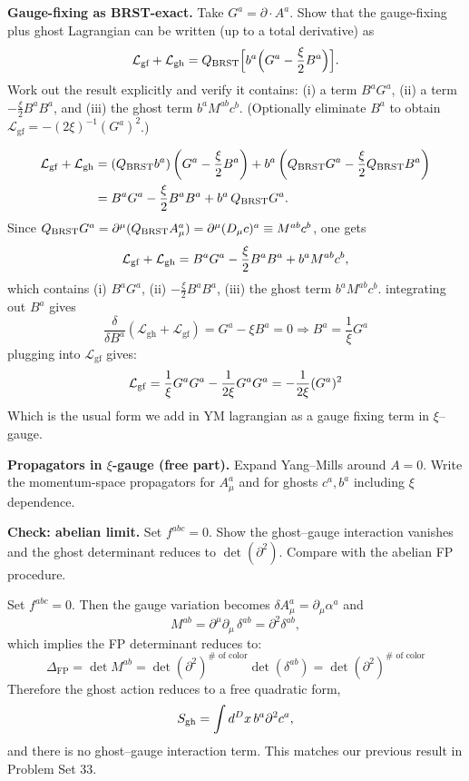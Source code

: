 \begin{problem}
    \textbf{Gauge-fixing as BRST-exact.} Take \(G^a=\partial\cdot A^a\). Show that the gauge-fixing plus ghost Lagrangian can be written (up to a total derivative) as
    \[
        \mathcal{L}_{\text{gf}}+\mathcal{L}_{\text{gh}}=Q_{\text{BRST}}\Bigl[b^a\Bigl(G^a-\frac{\xi}{2}B^a\Bigr)\Bigr].
    \]
    Work out the result explicitly and verify it contains: (i) a term \(B^aG^a\), (ii) a term \(-\frac{\xi}{2}B^aB^a\), and (iii) the ghost term \(b^aM^{ab}c^b\). (Optionally eliminate \(B^a\) to obtain \(\mathcal{L}_{\text{gf}}=-(2\xi)^{-1}(G^a)^2\).)
\end{problem}
\begin{solution}[35.5]
	\[
		\begin{aligned}
		\mathcal L_{\rm gf}+\mathcal L_{\rm gh}
		&= (Q_{\rm BRST}b^a)\left(G^a-\frac{\xi}{2}B^a\right)
		+ b^a\left(Q_{\rm BRST}G^a-\frac{\xi}{2}Q_{\rm BRST}B^a\right) \\
		&= B^a G^a - \frac{\xi}{2}B^a B^a + b^a\,Q_{\rm BRST}G^a .
	\end{aligned}
	\]
	Since $Q_{\rm BRST}G^a=\partial^\mu(Q_{\rm BRST}A_\mu^a)=\partial^\mu(D_\mu c)^a \equiv M^{ab}c^b$, one gets
	\[
		\mathcal L_{\rm gf}+\mathcal L_{\rm gh}
		= B^a G^a - \frac{\xi}{2}B^a B^a + b^a M^{ab}c^b,
	\]
	which contains (i) $B^aG^a$, (ii) $-\frac{\xi}{2}B^aB^a$, (iii) the ghost term $b^aM^{ab}c^b$. integrating out $B^a$ gives 
	\[
	\frac{\delta}{\delta B^a}\left(\mathcal{L}_{\text{gh}}+\mathcal{L}_{\text{gf}}\right)=G^a-\xi  B^a=0\Rightarrow B^a=\frac1\xi G^a
	\]
	plugging into $\mathcal{L}_{\text{gf}}$ gives:
	\[
 		\mathcal L_{\rm gf} =\frac1\xi G^a G^a-\frac{1}{2\xi} G^a G^a= -\frac{1}{2\xi}(G^a)^2
	\]
	Which is the usual form we add in YM lagrangian as a gauge fixing term in $\xi$--gauge.
\end{solution}
\begin{problem}
    \textbf{Propagators in \(\xi\)-gauge (free part).} Expand Yang–Mills around \(A=0\). Write the momentum-space propagators for \(A_\mu^a\) and for ghosts \(c^a,b^a\) including \(\xi\) dependence.
\end{problem}
\begin{problem}
    \textbf{Check: abelian limit.} Set \(f^{abc}=0\). Show the ghost–gauge interaction vanishes and the ghost determinant reduces to \(\det(\partial^2)\). Compare with the abelian FP procedure.
\end{problem}
\begin{solution}[35.7]
	Set $f^{abc}=0$.
	Then the gauge variation becomes $\delta A_\mu^a=\partial_\mu\alpha^a$ and
	\[
		M^{ab}=\partial^\mu\partial_\mu\,\delta^{ab}=\partial^2\delta^{ab},
	\]
	which implies the FP determinant reduces to:
	\[
	\boxed{
	\Delta_{\text{FP}}=\det M^{ab}=\det(\partial^2)^{\#{\text{ of color}}}\det(\delta^{ab})=\det(\partial^2)^{\#{\text{ of color}}}
	}
	\]
	Therefore the ghost action reduces to a free quadratic form,
	\[
		S_{\rm gh}=\int d^Dx\, b^a\partial^2 c^a,
	\]
	and there is no ghost--gauge interaction term. This matches our previous result in Problem Set 33.
\end{solution}
